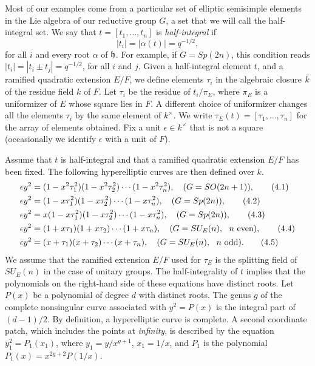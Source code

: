 \documentclass{amsart}
\begin{document}
Most of our examples come from a particular set of elliptic semisimple elements
in the Lie algebra of our reductive group $G$, a set that we will call
the half-integral set.  We say that $t=[t_1,\ldots,t_n]$ is {\it half-integral\/}
if $$|t_i| = |\alpha(t)| = q^{-1/2},$$
for all $i$ and every root $\alpha$ of ${\frak h}$.  For example, if $G=Sp(2n)$,
this condition reads $|t_i|=|t_i\pm t_j| = q^{-1/2}$,
for all $i$ and $j$.  Given a half-integral element $t$, and a ramified
quadratic extension $E/F$, we define elements $\tau_i$ in 
the algebraic closure $\bar k$ of the residue field $k$ of $F$.
Let $\tau_i$ be the residue of 
$t_i/\pi_E$, where $\pi_E$ is a uniformizer of $E$ whose
square lies in $F$.  A different choice of uniformizer changes
all  the elements
$\tau_i$ by the same element of $k^\times$.
We write $\tau_E(t) = [\tau_1,\ldots,\tau_n]$
for the array of elements obtained.
Fix a unit $\epsilon\in k^\times$ that is not a square
(occasionally we identify $\epsilon$ with a unit of $F$). 

Assume that $t$ is half-integral and that a ramified quadratic extension $E/F$
has been fixed.  The following hyperelliptic curves are then defined over $k$.
\begin{align*}
\epsilon y^2 &= ( 1 - x^2 \tau_1^2)(1 - x^2 \tau_2^2) \cdots (1-x^2\tau_n^2),
      \quad (G=SO(2n+1)),\tag{4.1}\\
\epsilon y^2 &= (1-x \tau_1^2)(1-x\tau_2^2)\cdots (1- x\tau_n^2),\quad
      (G=Sp(2n)),\tag{4.2}\\
\epsilon y^2 &= x (1-x \tau_1^2)(1-x \tau_2^2)\cdots (1-x \tau_n^2),\quad
      (G=Sp(2n)),\tag{4.3}\\
\epsilon y^2 &= (1 + x \tau_1)(1 + x \tau_2) \cdots (1 + x\tau_n),\quad
      (G=SU_E(n),\ \  n \hbox{ even}),\tag{4.4}\\
\epsilon y^2 &= (x + \tau_1)(x+ \tau_2)\cdots (x+\tau_n), \quad
      (G=SU_E(n),\ \  n \hbox{ odd}).\tag{4.5}
\end{align*}
We assume that the ramified extension $E/F$ used for
$\tau_E$ is the splitting field of $SU_E(n)$ in the
case of unitary groups.
The half-integrality  of $t$
implies that the polynomials on the
right-hand side of these equations have distinct roots. 
Let $P(x)$ be a polynomial of degree $d$ with distinct roots.
The genus $g$ of the complete nonsingular
curve associated with $y^2 = P(x)$ is the integral
part of $(d-1)/2$.  
By definition, a hyperelliptic curve is complete.
A second coordinate patch, which includes the points
at {\it infinity}, is described by the equation
$y_1^2 = P_1(x_1)$, where $y_1 = y/x^{g+1}$, 
$x_1 = 1/x$, and $P_1$ is the polynomial
$P_1(x) = x^{2g+2} P(1/x)$.
\end{document}
